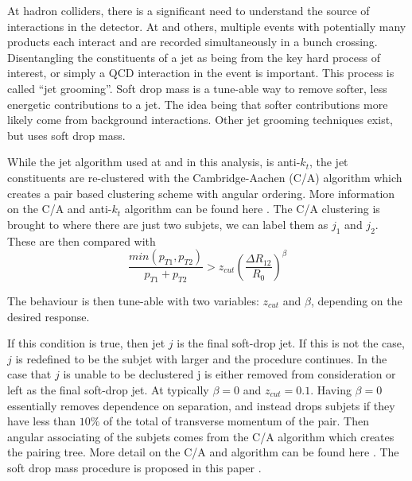 At hadron colliders, there is a significant need to understand the source of interactions in the detector.  At \CMS  and others, multiple events with potentially many products each interact and are recorded simultaneously in a bunch crossing.  Disentangling the constituents of a jet as being from the key hard process of interest, or simply a QCD interaction in the event is important. This process is called ``jet grooming''. Soft drop mass is a tune-able way to remove softer, less energetic contributions to a jet.  The idea being that softer contributions more likely come from background interactions. Other jet grooming techniques exist, but \CMS uses soft drop mass.

While the jet algorithm used at \CMS and in this analysis, is anti-\ensuremath{k_t}, the jet constituents are re-clustered with the Cambridge-Aachen (C/A) algorithm which creates a pair based clustering scheme with angular ordering. More information on the C/A and anti-\ensuremath{k_t} algorithm can be found here \cite{AK_jets}. The C/A clustering is brought to where there are just two subjets, we can label them as \ensuremath{j_1} and \ensuremath{j_2}.  These are then compared with
\begin{equation}
    \label{eq:SDmass}
    \frac{min\left(p_{T1},p_{T2}\right)}
    {p_{T1}+p_{T2}}
    >
    z_{cut}\left( \frac{\Delta R_{12}}{R_{0}} \right) ^ {\beta}
\end{equation}

The behaviour is then tune-able with two variables: \ensuremath{z_{cut}} and \ensuremath{\beta}, depending on the desired response.

If this condition is true, then jet \ensuremath{j} is the final soft-drop jet.  If this is not the case, \ensuremath{j} is redefined to be the subjet with larger \pt and the procedure continues.  In the case that \ensuremath{j} is unable to be declustered j is either removed from consideration or left as the final soft-drop jet.  At \CMS typically \ensuremath{\beta = 0} and \ensuremath{z_{cut} = 0.1}.  Having \ensuremath{\beta = 0} essentially removes dependence on separation, and instead drops subjets if they have less than \ensuremath{10\%} of the total of transverse momentum of the pair.  Then angular associating of the subjets comes from the C/A algorithm which creates the pairing tree.  More detail on the C/A  and \akalgorithm algorithm can be found here \cite{AK_jets}.  The soft drop mass procedure is proposed in this paper \cite{SoftDrop}.


